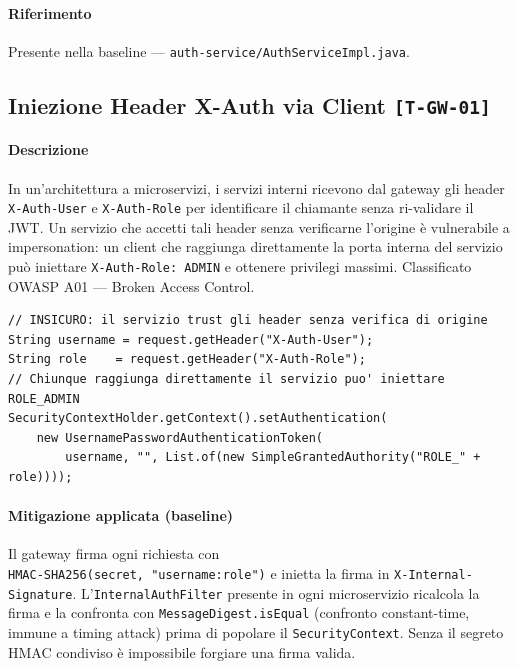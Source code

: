 ﻿\documentclass[a4paper,12pt]{report}
\newcommand{\threat}[1]{\texttt{\small\textcolor{vulnred}{[#1]}}}
\begin{document}
\paragraph{Riferimento} Presente nella baseline --- \texttt{auth-service/AuthServiceImpl.java}.

\subsection{Iniezione Header X-Auth via Client \threat{T-GW-01}}

\paragraph{Descrizione}
In un'architettura a microservizi, i servizi interni ricevono dal gateway gli header
\texttt{X-Auth-User} e \texttt{X-Auth-Role} per identificare il chiamante senza
ri-validare il JWT. Un servizio che accetti tali header senza verificarne l'origine
è vulnerabile a impersonation: un client che raggiunga direttamente la porta interna
del servizio può iniettare \texttt{X-Auth-Role: ADMIN} e ottenere privilegi massimi.
Classificato OWASP A01 --- Broken Access Control.

\begin{insecurebox}[title={Pattern Vulnerabile Evitato --- filtro servizi interni}]
\begin{lstlisting}[style=java]
// INSICURO: il servizio trust gli header senza verifica di origine
String username = request.getHeader("X-Auth-User");
String role    = request.getHeader("X-Auth-Role");
// Chiunque raggiunga direttamente il servizio puo' iniettare ROLE_ADMIN
SecurityContextHolder.getContext().setAuthentication(
    new UsernamePasswordAuthenticationToken(
        username, "", List.of(new SimpleGrantedAuthority("ROLE_" + role))));
\end{lstlisting}
\end{insecurebox}

\paragraph{Mitigazione applicata (baseline)}
Il gateway firma ogni richiesta con \\ \texttt{HMAC-SHA256(secret, "username:role")} e
inietta la firma in \texttt{X-Internal-Signature}. L'\texttt{InternalAuthFilter}
presente in ogni microservizio ricalcola la firma e la confronta con
\texttt{MessageDigest.isEqual} (confronto constant-time, immune a timing attack)
prima di popolare il \texttt{SecurityContext}. Senza il segreto HMAC condiviso è
impossibile forgiare una firma valida.
\end{document}
